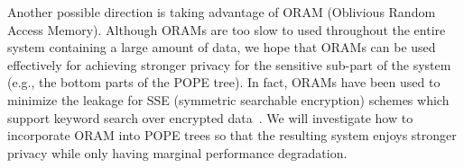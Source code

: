 Another possible direction is taking advantage of ORAM (Oblivious Random Access
Memory). Although ORAMs are too slow to used throughout the entire system
containing a large amount of data, we hope that ORAMs can be used effectively
for achieving stronger privacy for the sensitive sub-part of the system (e.g.,
the bottom parts of the POPE tree).  In fact, ORAMs have been used to minimize
the leakage for SSE (symmetric searchable encryption) schemes which support
keyword search over encrypted
data~\cite{NDSS:StePapShi14,C:GarMohPap16,RSA:IKLO16}. We will investigate how
to incorporate ORAM into POPE trees so that the resulting system enjoys
stronger privacy while only having marginal performance degradation.  

